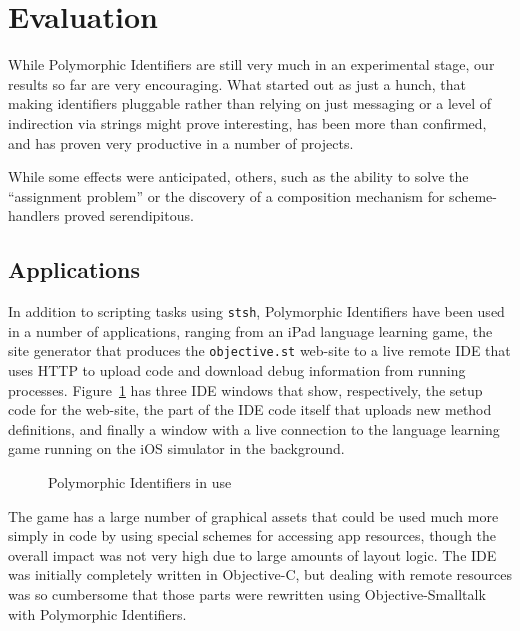 \documentclass[preprint]{sigplanconf}
\begin{document}

\section{Evaluation}
\label{evaluation}

While Polymorphic Identifiers are still very much in an experimental stage, our
results so far are very encouraging.  What started out as just a hunch, that making
identifiers pluggable rather than relying on just messaging or a level of indirection
via strings might prove interesting, has been more than confirmed, and has proven
very productive in a number of projects.

While some effects were anticipated, others, such as the ability to solve the
``assignment problem'' or the discovery of a composition mechanism for
scheme-handlers proved serendipitous.  



\subsection{Applications}

In addition to scripting tasks using {\tt stsh}, Polymorphic Identifiers have been used in a number
of applications, ranging from an iPad language learning game, the site generator that produces the {\tt objective.st} web-site to a
live remote IDE that uses HTTP to upload code and download debug information from running processes.  Figure~\ref{pi-inuse}
has three IDE windows that show, respectively, the setup code for the web-site, the part of the IDE code itself that uploads new method definitions,
and finally a window with a live connection to the language learning game running on the iOS simulator in the background.

\begin{figure}[htbp]
\centering
\caption{Polymorphic Identifiers in use}
\label{pi-inuse}
\end{figure}


The game has a large number of graphical assets that could be used much more simply in code by using special schemes for accessing app
resources, though the overall impact was not very high due to large amounts of layout logic. 
 The IDE was initially completely written in Objective-C, but dealing with remote resources was so cumbersome that
those parts were rewritten using Objective-Smalltalk with Polymorphic Identifiers.
\end{document}
